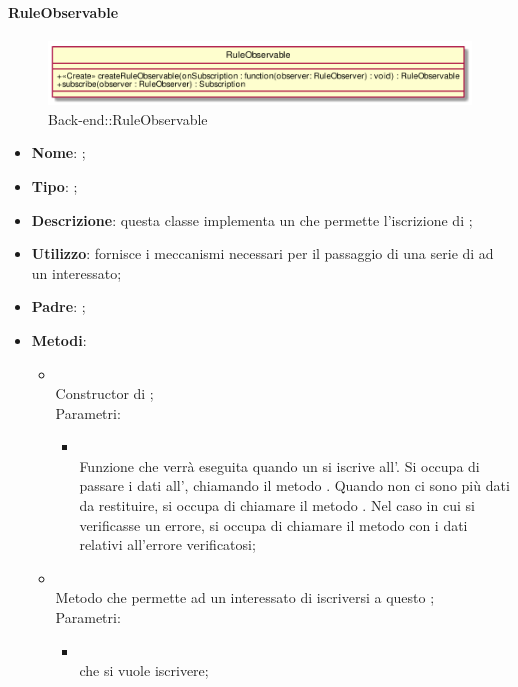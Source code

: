 \hypertarget{RuleObservable_label}{\paragraph{RuleObservable}}
\begin{figure}[h]
	\centering
	\includegraphics[width=\textwidth,height=\textheight,keepaspectratio]{images/ClassRuleObservable.png}
	\caption{Back-end::RuleObservable}
\end{figure}
\begin{itemize}
	\item \textbf{Nome}: ;
	\item \textbf{Tipo}: ;
	\item \textbf{Descrizione}: questa classe implementa un  che permette l'iscrizione di ;
	\item \textbf{Utilizzo}: fornisce i meccanismi necessari per il passaggio di una serie di  ad un  interessato;
	\item \textbf{Padre}: ;
	\item \textbf{Metodi}:
	\begin{itemize}
		\item[]  \\
		Constructor di ;\\
		Parametri:
		\begin{itemize}
			\item {} \\
			Funzione che verrà eseguita quando un  si iscrive all'. Si occupa di passare i dati all', chiamando il metodo . Quando non ci sono più dati da restituire, si occupa di chiamare il metodo . Nel caso in cui si verificasse un errore, si occupa di chiamare il metodo  con i dati relativi all'errore verificatosi;
		\end{itemize}
		\item[]  \\
		Metodo che permette ad un  interessato di iscriversi a questo ;\\
		Parametri:
		\begin{itemize}
			\item {} \\
			 che si vuole iscrivere;
		\end{itemize}
	\end{itemize}
\end{itemize}

